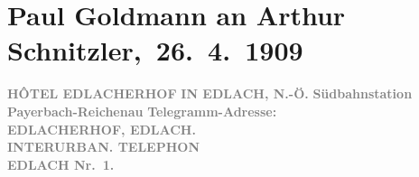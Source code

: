 

         
         \renewcommand{\erwaehntePersonen}{Personen: Lili Cappellini, Paul Goldmann, Eva Marie Goldmann, Rudolf Lothar, Olga Schnitzler, Heinrich Schnitzler}
         \renewcommand{\erwaehnteInstitutionen}{Institutionen: k. k. Post- und Telegraphenverwaltung}
         \renewcommand{\erwaehnteOrte}{Orte: Bahnhof Payerbach-Reichenau, Berlin, Deutsches Theater Berlin, Edlach, Hotel Edlacherhof, Niederösterreich, Semmering, Wien}
         \renewcommand{\erwaehnteWerke}{Werke: Faust bei Reinhardt, Faust. Eine Tragödie, Pester Lloyd}
               \section[ Paul Goldmann an Arthur Schnitzler, 26. 4. 1909]{ Paul Goldmann an Arthur Schnitzler, 26. 4. 1909}\nopagebreak{}\rehead{ }\begin{ledgroupsized}[t]{13cm}\normalsize\beginnumbering{} \toendnotes[C]{\smallbreak\pagebreak[2]} 
\toendnotes[C]{\smallbreak}\pstart
           \noindent{}{\pb}\textcolor{gray}{\textbf{HÔTEL EDLACHERHOF}}\pend
           \pstart
           \raggedleft{}\textcolor{gray}{\textbf{IN EDLACH, N.-Ö.}}\pend
           \pstart
           \noindent{}\raggedleft{}\textcolor{gray}{\textbf{\textbf{Südbahnstation Payerbach-Reichenau}}}\pend
           \pstart
           \noindent{}\textcolor{gray}{\textbf{Telegramm-Adresse:}}{\\}\textcolor{gray}{\textbf{\textbf{EDLACHERHOF, EDLACH.}}}{\\}\textcolor{gray}{\textbf{INTERURBAN. TELEPHON}}{\\}\textcolor{gray}{\textbf{\textbf{EDLACH Nr. 1.}}}\pend

\end{ledgroupsized}
